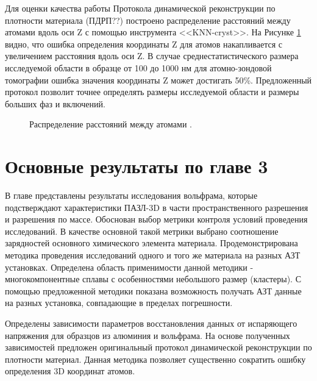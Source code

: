Для оценки качества работы Протокола динамической реконструкции по плотности материала (ПДРП??) построено распределение расстояний между атомами вдоль оси Z с помощью инструмента <<KNN-cryst>>. На Рисунке \cref{fig:p3_atomiccount_distance} видно, что ошибка определения координаты Z для атомов накапливается с увеличением расстояния вдоль оси Z. В случае среднестатистического размера исследуемой области в 
образце от 100 до 1000 нм для атомно-зондовой томографии ошибка значения координаты Z может достигать 50\%. Предложенный протокол позволит точнее определять размеры исследуемой области и размеры больших фаз и включений.

\begin{figure}[htb]
	\caption{Распределение расстояний между атомами \cite{scbibDensity}.}
	\label{fig:p3_atomiccount_distance}
\end{figure}




\FloatBarrier
\clearpage
\section{Основные результаты по главе 3}\label{sec:ch3/sect6}

В главе представлены результаты исследования вольфрама, которые подстверждают характеристики ПАЗЛ-3D в части пространственного разрешения и разрешения по массе. Обоснован выбор метрики контроля условий проведения исследований. В качестве основной такой метрики выбрано соотношение зарядностей основного химического элемента материала. Продемонстрирована методика проведения исследований одного и того же материала на разных АЗТ установках. Определена область применимости данной методики - многокомпонентные сплавы с особенностями небольшого размер (кластеры). С помощью предложенной методики показана возможность получать АЗТ данные на разных установка, совпадающие в пределах погрешности.

Определены зависимости параметров восстановления данных от испаряющего напряжения для образцов из алюминия и вольфрама. На основе полученных зависимостей предложен оригинальный протокол динамической реконструкции по плотности материал. Данная методика позволяет существенно сократить ошибку определения 3D координат атомов.










\clearpage
